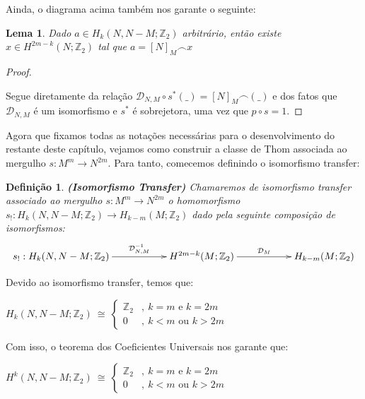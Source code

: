 \documentclass[12pt,oneside]{book} %
\newtheorem{defi}   {\hspace{0.5cm}Defini\c c\~ao}[chapter]
\newtheorem{lem}    {\hspace{0.5cm}Lema}[chapter]
\newcommand{\Z}{\mathbb{Z}}
\newcommand{\ccap}{\frown}
\begin{document}
\par Ainda, o diagrama acima também nos garante o seguinte:

\begin{lem}\label{lema_tecnico_dualidades}
	Dado $a\in H_{k}(N,N-M;\Z_{2})$ arbitrário, então existe $x\in H^{2m-k}(N;\Z_{2})$ tal que $a=[N]_{M}\ccap x$
\end{lem}
\begin{proof}
	
	\
	
	\par Segue diretamente da relação $\mathcal{D}_{N,M}\circ s^{*}(\_)=[N]_{M}\ccap(\_)$ e dos fatos que $\mathcal{D}_{N,M}$ é um isomorfismo e $s^{*}$ é sobrejetora, uma vez que $p\circ s=1$.
	
\end{proof}

\par Agora que fixamos todas as notações necessárias para o desenvolvimento do restante deste capítulo, vejamos como construir a classe de Thom associada ao mergulho $s:M^{m}\to N^{2m}$. Para tanto, comecemos definindo o isomorfismo transfer:

\begin{defi}{\bf (Isomorfismo Transfer)}
	Chamaremos de isomorfismo transfer associado ao mergulho $s:M^{m}\to N^{2m}$ o homomorfismo $s_{!}:H_{k}(N,N-M;\Z_{2})\to H_{k-m}(M;\Z_{2})$ dado pela seguinte composição de isomorfismos:
		$$ \xymatrix @C=0.5cm {
		s_{!}:H_{k}(N,N-M;\Z_{2}) \ar[rrr]^-{\mathcal{D}^{-1}_{N,M}} &&& H^{2m-k}(M;\Z_{2}) \ar[rrr]^-{\mathcal{D}_{M}} &&& H_{k-m}(M;\Z_{2})
		} $$
\end{defi}

\par Devido ao isomorfismo transfer, temos que: \newline

$H_{k}(N,N-M;\Z_{2}) \ \cong \ \left\{\begin{array}{cl}
	\Z_{2} & , \ k=m \mbox{ e } k=2m \\
	0      & , \ k<m \mbox{ ou } k>2m
\end{array}\right.$ \newline

\par Com isso, o teorema dos Coeficientes Universais nos garante que: \newline

$H^{k}(N,N-M;\Z_{2}) \ \cong \ \left\{\begin{array}{cl}
	\Z_{2} & , \ k=m \mbox{ e } k=2m \\
	0      & , \ k<m \mbox{ ou } k>2m
\end{array}\right.$ \newline
\end{document}
